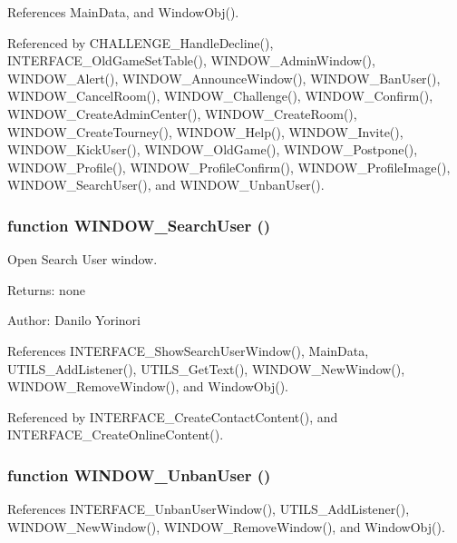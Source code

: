 References MainData, and WindowObj().

Referenced by CHALLENGE\_\-HandleDecline(), INTERFACE\_\-OldGameSetTable(), WINDOW\_\-AdminWindow(), WINDOW\_\-Alert(), WINDOW\_\-AnnounceWindow(), WINDOW\_\-BanUser(), WINDOW\_\-CancelRoom(), WINDOW\_\-Challenge(), WINDOW\_\-Confirm(), WINDOW\_\-CreateAdminCenter(), WINDOW\_\-CreateRoom(), WINDOW\_\-CreateTourney(), WINDOW\_\-Help(), WINDOW\_\-Invite(), WINDOW\_\-KickUser(), WINDOW\_\-OldGame(), WINDOW\_\-Postpone(), WINDOW\_\-Profile(), WINDOW\_\-ProfileConfirm(), WINDOW\_\-ProfileImage(), WINDOW\_\-SearchUser(), and WINDOW\_\-UnbanUser().
\subsubsection[WINDOW\_\-SearchUser]{\setlength{\rightskip}{0pt plus 5cm}function WINDOW\_\-SearchUser ()}\label{window_2window_8js_c12a5400ad4c700cfc149d03ae412c47}


Open Search User window. 

\begin{Desc}
\item[Returns:]none \end{Desc}
\begin{Desc}
\item[Author:]Danilo Yorinori \end{Desc}


References INTERFACE\_\-ShowSearchUserWindow(), MainData, UTILS\_\-AddListener(), UTILS\_\-GetText(), WINDOW\_\-NewWindow(), WINDOW\_\-RemoveWindow(), and WindowObj().

Referenced by INTERFACE\_\-CreateContactContent(), and INTERFACE\_\-CreateOnlineContent().
\subsubsection[WINDOW\_\-UnbanUser]{\setlength{\rightskip}{0pt plus 5cm}function WINDOW\_\-UnbanUser ()}\label{window_2window_8js_a6de30616a652bce072098f4e3ff5ca7}




References INTERFACE\_\-UnbanUserWindow(), UTILS\_\-AddListener(), WINDOW\_\-NewWindow(), WINDOW\_\-RemoveWindow(), and WindowObj().